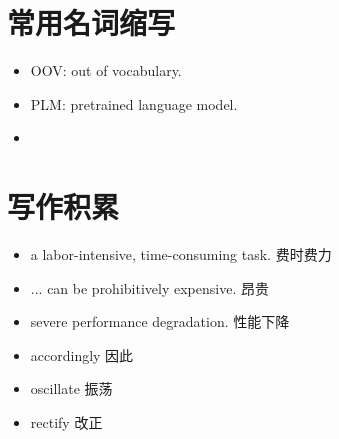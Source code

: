 \documentclass{article}
\begin{document}
\section{常用名词缩写}
\begin{itemize}
    \item OOV: out of vocabulary.
    \item PLM: pretrained language model.
    \item 
\end{itemize}

\section{写作积累}
\begin{itemize}
    \item a labor-intensive, time-consuming task.   费时费力
    \item ... can be prohibitively expensive.   昂贵
    \item severe performance degradation.   性能下降
    \item accordingly   因此
    \item oscillate     振荡
    \item rectify   改正
\end{itemize}
\end{document}

